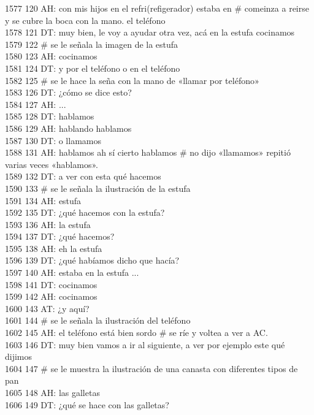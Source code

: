 1577 120 AH: con mis hijos en el refri(refigerador) estaba en # comeinza a reirse y se cubre la boca con la mano. el teléfono\\
1578 121 DT: muy bien, le voy a ayudar otra vez, acá en la estufa cocinamos\\
1579 122 # se le señala la imagen de la estufa\\
1580 123 AH: cocinamos\\
1581 124 DT: y por el teléfono o en el teléfono\\
1582 125 # se le hace la seña con la mano de «llamar por teléfono»\\
1583 126 DT: ¿cómo se dice esto?\\
1584 127 AH: ...\\
1585 128 DT: hablamos\\
1586 129 AH: hablando hablamos\\
1587 130 DT: o llamamos\\
1588 131 AH: hablamos ah sí cierto hablamos # no dijo «llamamos» repitió varias veces «hablamos».\\
1589 132 DT: a ver con esta qué hacemos\\
1590 133 # se le señala la ilustración de la estufa\\
1591 134 AH: estufa\\
1592 135 DT: ¿qué hacemos con la estufa?\\
1593 136 AH: la estufa\\
1594 137 DT: ¿qué hacemos?\\
1595 138 AH: eh la estufa\\
1596 139 DT: ¿qué habíamos dicho que hacía?\\
1597 140 AH: estaba en la estufa ...\\
1598 141 DT: cocinamos\\
1599 142 AH: cocinamos\\
1600 143 AT: ¿y aquí?\\
1601 144 # se le señala la ilustración del teléfono\\
1602 145 AH: el teléfono está bien sordo # se ríe y voltea a ver a AC.\\
1603 146 DT: muy bien vamos a ir al siguiente, a ver por ejemplo este qué dijimos\\
1604 147 # se le muestra la ilustración de una canasta con diferentes tipos de pan\\
1605 148 AH: las galletas\\
1606 149 DT: ¿qué se hace con las galletas?\\
